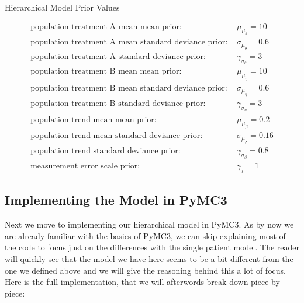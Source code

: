 \documentclass[12pt,a4paper,leqno]{report}
\theoremstyle{plain}
\theoremstyle{definition}
\theoremstyle{remark}
\begin{document}
\begin{table}[H]
    \caption{Hierarchical Model Prior Values}\label{hierarchicalmodelpriorvalues}
    \begin{align}\label{}
        \text{population treatment A mean mean prior: } & \mu_{\mu_{\theta}} = 10 \nonumber \\
        \text{population treatment A mean standard deviance prior: } & \sigma_{\mu_{\theta}} = 0.6 \nonumber \\
        \text{population treatment A standard deviance prior: } & \gamma_{\sigma_{\theta}} = 3 \nonumber \\
        \text{population treatment B mean mean prior: } & \mu_{\mu_{\eta}} = 10 \nonumber \\
        \text{population treatment B mean standard deviance prior: } & \sigma_{\mu_{\eta}} = 0.6 \nonumber \\
        \text{population treatment B standard deviance prior: } & \gamma_{\sigma_{\eta}} = 3 \nonumber \\
        \text{population trend mean mean prior: } & \mu_{\mu_{\beta}} = 0.2 \nonumber \\
        \text{population trend mean standard deviance prior: } & \sigma_{\mu_{\beta}} = 0.16 \nonumber \\
        \text{population trend standard deviance prior: } & \gamma_{\sigma_{\beta}} = 0.8 \nonumber \\
        \text{measurement error scale prior: } & \gamma_{\tau} = 1 \nonumber
    \end{align}
\end{table}

\subsection{Implementing the Model in PyMC3}

Next we move to implementing our hierarchical model in PyMC3. As by now we are already
familiar with the basics of PyMC3, we can skip explaining most of the code to focus
just on the differences with the single patient model. The reader will quickly
see that the model we have here seems to be a bit different from the one we defined
above and we will give the reasoning behind this a lot of focus. Here is the full
implementation, that we will afterwords break down piece by piece:
\end{document}
